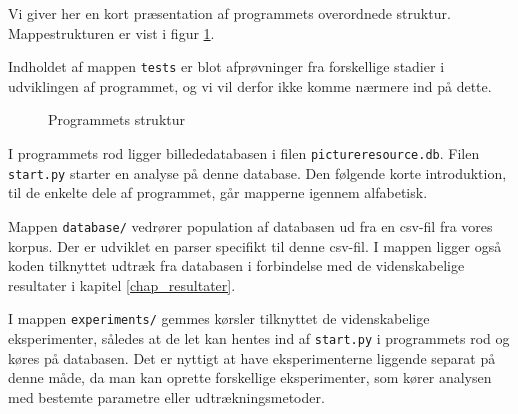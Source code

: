 {
{\sffamily Vi giver her en kort præsentation af programmets overordnede
struktur. Mappestrukturen er vist i figur \ref{program_struktur}.

Indholdet af mappen \texttt{tests} er blot afprøvninger fra forskellige
stadier i udviklingen af programmet, og vi vil derfor ikke komme nærmere
ind på dette.

\begin{figure}[!h]
    \caption[]{Programmets struktur}
    \label{program_struktur}
\end{figure}

I programmets rod ligger billededatabasen i filen
\texttt{pictureresource.db}. Filen \texttt{start.py} starter en analyse
på denne database. Den følgende korte introduktion, til de enkelte dele
af programmet, går mapperne igennem alfabetisk.

}

\vspace{1.4em}
\vspace{1.4em}
Mappen \texttt{database/} vedrører population af databasen ud fra en
csv-fil fra vores korpus. Der er udviklet en parser specifikt til denne
csv-fil. I mappen ligger også koden tilknyttet udtræk fra databasen
i forbindelse med de videnskabelige resultater i kapitel
\ref{chap_resultater}.

\vspace{1.4em}
\vspace{1.4em}

I mappen \texttt{experiments/} gemmes kørsler tilknyttet de
videnskabelige eksperimenter, således at de let kan hentes ind af
\texttt{start.py} i programmets rod og køres på databasen. Det er
nyttigt at have eksperimenterne liggende separat på denne måde, da man
kan oprette forskellige eksperimenter, som kører analysen med bestemte
parametre eller udtrækningsmetoder.

\vspace{1.4em}
\vspace{1.4em}

}
